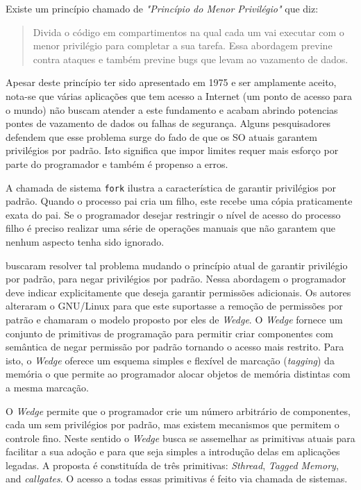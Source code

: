 Existe um princípio chamado de \emph{"Princípio do Menor Privilégio"} que diz:

\begin{quote}
Divida o código em compartimentos na qual cada um vai executar com o menor
privilégio para completar a sua tarefa. Essa abordagem previne contra ataques
e também previne bugs que levam ao vazamento de dados.
\citep{protectionprinciple}
\end{quote}

Apesar deste princípio ter sido apresentado em 1975 e ser amplamente aceito,
nota-se que várias aplicações que tem acesso a Internet (um ponto de acesso
para o mundo) não buscam atender a este fundamento e acabam abrindo
potencias pontes de vazamento de dados ou falhas de segurança. Alguns
pesquisadores defendem que esse problema surge do fado de que os SO atuais
garantem privilégios por padrão. Isto significa que impor limites requer mais
esforço por parte do programador e também é propenso a erros.

A chamada de sistema \texttt{fork} ilustra a característica de garantir
privilégios por padrão. Quando o processo pai cria um filho, este recebe uma
cópia praticamente exata do pai. Se o programador desejar restringir o nível de
acesso do processo filho é preciso realizar uma série de operações manuais que
não garantem que nenhum aspecto tenha sido ignorado.

\cite{wedge} buscaram resolver tal problema mudando o princípio atual de
garantir privilégio por padrão, para negar privilégios por padrão. Nessa
abordagem o programador deve indicar explicitamente que deseja garantir
permissões adicionais. Os autores alteraram o GNU/Linux para que este
suportasse a remoção de permissões por patrão e chamaram o modelo proposto por
eles de \emph{Wedge}. O \emph{Wedge} fornece um conjunto de primitivas de
programação para permitir criar componentes com semântica de negar permissão
por padrão tornando o acesso mais restrito. Para isto, o \emph{Wedge} oferece
um esquema simples e flexível de marcação (\emph{tagging}) da memória o que
permite ao programador alocar objetos de memória distintas com a mesma
marcação.

O \emph{Wedge} permite que o programador crie um número arbitrário de
componentes, cada um sem privilégios por padrão, mas existem mecanismos que
permitem o controle fino. Neste sentido o \emph{Wedge} busca se assemelhar as
primitivas atuais para facilitar a sua adoção e para que seja simples a
introdução delas em aplicações legadas. A proposta é constituída de três
primitivas: \emph{Sthread}, \emph{Tagged Memory}, and \emph{callgates}. O
acesso a todas essas primitivas é feito via chamada de sistemas.

